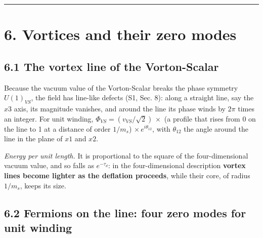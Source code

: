 \documentclass[
  10pt,
]{article}
\begin{document}
\begin{center}\rule{0.5\linewidth}{0.5pt}\end{center}

\hypertarget{vortices-and-their-zero-modes}{%
\section{6. Vortices and their zero
modes}\label{vortices-and-their-zero-modes}}

\hypertarget{the-vortex-line-of-the-vorton-scalar}{%
\subsection{6.1 The vortex line of the
Vorton-Scalar}\label{the-vortex-line-of-the-vorton-scalar}}

Because the vacuum value of the Vorton-Scalar breaks the phase symmetry
\(U(1)_{VS}\), the field has line-like defects (S1, Sec. 8): along a
straight line, say the \(x3\) axis, its magnitude vanishes, and around
the line its phase winds by \(2\pi\) times an integer. For unit winding,
\(\Phi_{VS}=(v_{VS}/\sqrt2)\,\times\) (a profile that rises from 0 on
the line to 1 at a distance of order \(1/m_s\))
\(\times\,e^{i\theta_{12}}\), with \(\theta_{12}\) the angle around the
line in the plane of \(x1\) and \(x2\).

\emph{Energy per unit length.} It is proportional to the square of the
four-dimensional vacuum value, and so falls as \(e^{-\tau_d}\): in the
four-dimensional description \textbf{vortex lines become lighter as the
deflation proceeds}, while their core, of radius \(1/m_s\), keeps its
size.

\hypertarget{fermions-on-the-line-four-zero-modes-for-unit-winding}{%
\subsection{6.2 Fermions on the line: four zero modes for unit
winding}\label{fermions-on-the-line-four-zero-modes-for-unit-winding}}
\end{document}
